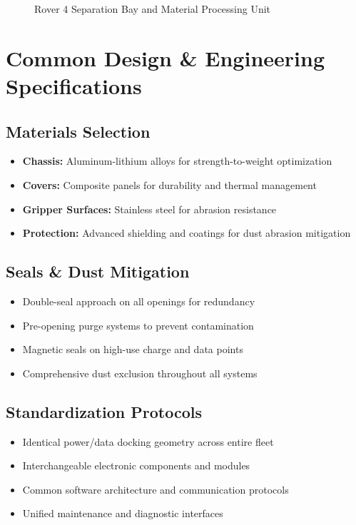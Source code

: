 \documentclass[12pt, a4paper]{article}
\begin{document}
\begin{figure}[h!]
\begin{minipage}{0.45\textwidth}
        \caption{Rover 4 Separation Bay and Material Processing Unit}
        \label{fig:rover4_design}
    \end{minipage}
\end{figure}

\section{Common Design \& Engineering Specifications}

\subsection{Materials Selection}
\begin{itemize}
    \item \textbf{Chassis:} Aluminum-lithium alloys for strength-to-weight optimization
    \item \textbf{Covers:} Composite panels for durability and thermal management
    \item \textbf{Gripper Surfaces:} Stainless steel for abrasion resistance
    \item \textbf{Protection:} Advanced shielding and coatings for dust abrasion mitigation
\end{itemize}

\subsection{Seals \& Dust Mitigation}
\begin{itemize}
    \item Double-seal approach on all openings for redundancy
    \item Pre-opening purge systems to prevent contamination
    \item Magnetic seals on high-use charge and data points
    \item Comprehensive dust exclusion throughout all systems
\end{itemize}

\subsection{Standardization Protocols}
\begin{itemize}
    \item Identical power/data docking geometry across entire fleet
    \item Interchangeable electronic components and modules
    \item Common software architecture and communication protocols
    \item Unified maintenance and diagnostic interfaces
\end{itemize}
\end{document}
